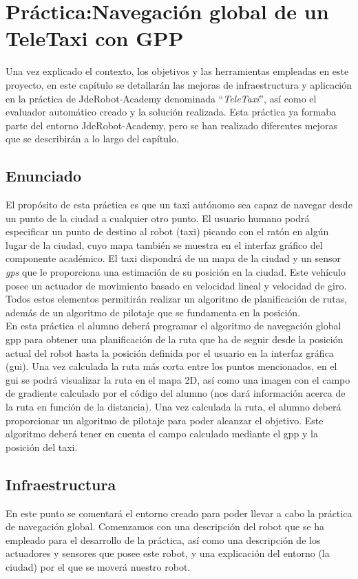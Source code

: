 \chapter{Práctica:Navegación global de un TeleTaxi con GPP}\label{cap.gpp}
 Una vez explicado el contexto, los objetivos y las herramientas empleadas en este proyecto, en este capítulo se detallarán las mejoras de infraestructura y aplicación en la práctica de JdeRobot-Academy denominada ``\textit{TeleTaxi}'', así como el evaluador automático creado y la solución realizada. Esta práctica ya formaba parte del entorno JdeRobot-Academy, pero se han realizado diferentes mejoras que se describirán a lo largo del capítulo.

\section{Enunciado} \label{sec.enunciado}
El propósito de esta práctica es que un taxi autónomo sea capaz de navegar desde un punto de la ciudad a cualquier otro punto. El usuario humano podrá especificar un punto de destino al robot (taxi) picando con el ratón en algún lugar de la ciudad, cuyo mapa también se muestra en el interfaz gráfico del componente académico. El taxi dispondrá de un mapa de la ciudad y un sensor \textit{\acrfull{gps}} que le proporciona una estimación de su posición en la ciudad. Este vehículo posee un actuador de movimiento basado en velocidad lineal y velocidad de giro. Todos estos elementos permitirán realizar un algoritmo de planificación de rutas, además de un algoritmo de pilotaje que se fundamenta en la posición.\\ 

En esta práctica el alumno deberá programar el algoritmo de navegación global \acrfull{gpp} para obtener una planificación de la ruta que ha de seguir desde la posición actual del robot hasta la posición definida por el usuario en la interfaz gráfica (\acrshort{gui}). Una vez calculada la ruta más corta entre los puntos mencionados, en el \acrshort{gui} se podrá visualizar la ruta en el mapa 2D, así como una imagen con el campo de gradiente calculado por el código del alumno (nos dará información acerca de la ruta en función de la distancia). Una vez calculada la ruta, el alumno deberá proporcionar un algoritmo de pilotaje para poder alcanzar el objetivo. Este algoritmo deberá tener en cuenta el campo calculado mediante el \acrshort{gpp} y la posición del taxi. 

\section{Infraestructura}
En este punto se comentará el entorno creado para poder llevar a cabo la práctica de navegación global. Comenzamos con una descripción del robot que se ha empleado para el desarrollo de la práctica, así como una descripción de los actuadores y sensores que posee este robot, y una explicación del entorno (la ciudad) por el que se moverá nuestro robot.

